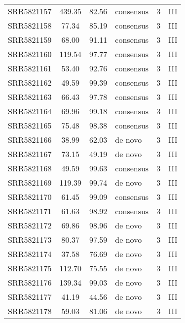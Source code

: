 \begin{scriptsize}
\begin{center}
\begin{longtable}{@{}lcclcc@{}}
SRR5821157 & 439.35        & 82.56       & consensus    & 3        & III      \\
SRR5821158 & 77.34         & 85.19       & consensus    & 3        & III      \\
SRR5821159 & 68.00         & 91.11       & consensus    & 3        & III      \\
SRR5821160 & 119.54        & 97.77       & consensus    & 3        & III      \\
SRR5821161 & 53.40         & 92.76       & consensus    & 3        & III      \\
SRR5821162 & 49.59         & 99.39       & consensus    & 3        & III      \\
SRR5821163 & 66.43         & 97.78       & consensus    & 3        & III      \\
SRR5821164 & 69.96         & 99.18       & consensus    & 3        & III      \\
SRR5821165 & 75.48         & 98.38       & consensus    & 3        & III      \\
SRR5821166 & 38.99         & 62.03       & de novo      & 3        & III      \\
SRR5821167 & 73.15         & 49.19       & de novo      & 3        & III      \\
SRR5821168 & 49.59         & 99.63       & consensus    & 3        & III      \\
SRR5821169 & 119.39        & 99.74       & de novo      & 3        & III      \\
SRR5821170 & 61.45         & 99.09       & consensus    & 3        & III      \\
SRR5821171 & 61.63         & 98.92       & consensus    & 3        & III      \\
SRR5821172 & 69.86         & 98.96       & de novo      & 3        & III      \\
SRR5821173 & 80.37         & 97.59       & de novo      & 3        & III      \\
SRR5821174 & 37.58         & 76.69       & de novo      & 3        & III      \\
SRR5821175 & 112.70        & 75.55       & de novo      & 3        & III      \\
SRR5821176 & 139.34        & 99.03       & de novo      & 3        & III      \\
SRR5821177 & 41.19         & 44.56       & de novo      & 3        & III      \\
SRR5821178 & 59.03         & 81.06       & de novo      & 3        & III      \\

\end{longtable}
\end{center}
\end{scriptsize}
